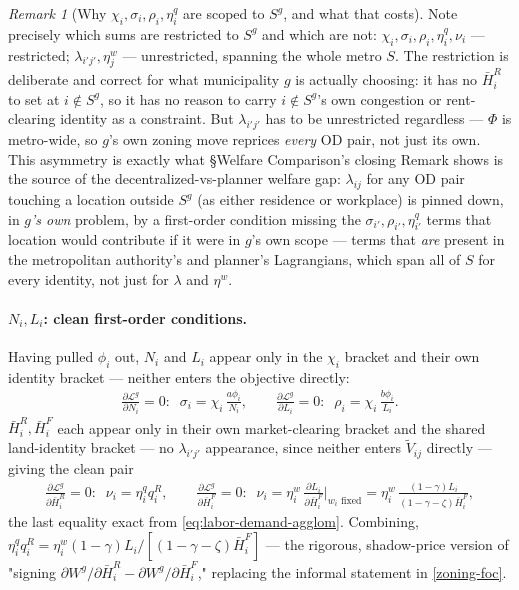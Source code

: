 \documentclass[12pt, a4paper]{article}
\theoremstyle{definition}
\theoremstyle{remark}
\newtheorem*{remark}{Remark}
\begin{document}
\begin{remark}[Why $\chi_i,\sigma_i,\rho_i,\eta_i^q$ are scoped to $S^g$, and what that costs]
Note precisely which sums are restricted to $S^g$ and which are not: $\chi_i,\sigma_i,\rho_i,\eta_i^q,\nu_i$ — restricted; $\lambda_{i'j'},\eta_j^w$ — unrestricted, spanning the whole metro $S$. The restriction is deliberate and correct for what municipality $g$ is actually choosing: it has no $\bar H_i^R$ to set at $i\notin S^g$, so it has no reason to carry $i\notin S^g$'s own congestion or rent-clearing identity as a constraint. But $\lambda_{i'j'}$ has to be unrestricted regardless — $\Phi$ is metro-wide, so $g$'s own zoning move reprices \emph{every} OD pair, not just its own. This asymmetry is exactly what \S Welfare Comparison's closing Remark shows is the source of the decentralized-vs-planner welfare gap: $\lambda_{ij}$ for any OD pair touching a location outside $S^g$ (as either residence or workplace) is pinned down, in \emph{$g$'s own} problem, by a first-order condition missing the $\sigma_{i'},\rho_{i'},\eta_{i'}^q$ terms that location would contribute if it were in $g$'s own scope — terms that \emph{are} present in the metropolitan authority's and planner's Lagrangians, which span all of $S$ for every identity, not just for $\lambda$ and $\eta^w$.
\end{remark}

\paragraph{$N_i,L_i$: clean first-order conditions.} Having pulled $\phi_i$ out, $N_i$ and $L_i$ appear only in the $\chi_i$ bracket and their own identity bracket — neither enters the objective directly:
\begin{align}
    \label{eq:muni-NL-focs}
\frac{\partial\mathcal L^g}{\partial N_i}=0:\;\; \sigma_i = \chi_i\,\frac{a\phi_i}{N_i},
\qquad
\frac{\partial\mathcal L^g}{\partial L_i}=0:\;\; \rho_i = \chi_i\,\frac{b\phi_i}{L_i}.
\end{align}
$\bar H_i^R,\bar H_i^F$ each appear only in their own market-clearing bracket and the shared land-identity bracket — no $\lambda_{i'j'}$ appearance, since neither enters $\tilde V_{ij}$ directly — giving the clean pair
\begin{align}
    \label{eq:muni-land-foc}
\frac{\partial\mathcal L^g}{\partial \bar H_i^R}=0:\;\; \nu_i=\eta_i^q q_i^R,
\qquad
\frac{\partial\mathcal L^g}{\partial \bar H_i^F}=0:\;\; \nu_i=\eta_i^w\,\frac{\partial L_i}{\partial \bar H_i^F}\bigg|_{w_i\text{ fixed}} = \eta_i^w\,\frac{(1-\gamma)L_i}{(1-\gamma-\zeta)\bar H_i^F},
\end{align}
the last equality exact from \eqref{eq:labor-demand-agglom}. Combining, $\eta_i^qq_i^R=\eta_i^w(1-\gamma)L_i/[(1-\gamma-\zeta)\bar H_i^F]$ — the rigorous, shadow-price version of "signing $\partial W^g/\partial\bar H_i^R-\partial W^g/\partial\bar H_i^F$," replacing the informal statement in \eqref{zoning-foc}.
\end{document}
